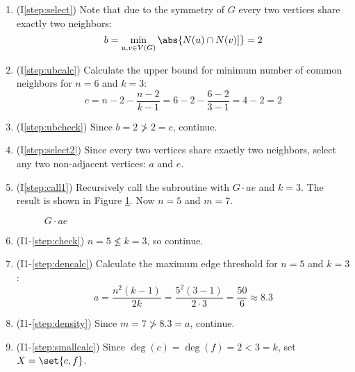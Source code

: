 \begin{enumerate}
\item (I\ref{step:select}) Note that due to the symmetry of \(G\) every two vertices share exactly two neighbors:
  \[b=\min_{u,v\in V(G)}\abs{N(u)\cap N(v)]}=2\]

\item (I\ref{step:ubcalc}) Calculate the upper bound for minimum number of common neighbors for \(n=6\) and
  \(k=3\):
  \[c=n-2-\frac{n-2}{k-1}=6-2-\frac{6-2}{3-1}=4-2=2\]

\item (I\ref{step:ubcheck}) Since \(b=2\ngtr2=c\), continue.

\item (I\ref{step:select2}) Since every two vertices share exactly two neighbors, select any two non-adjacent
  vertices: \(a\) and \(e\).

\item (I\ref{step:call1}) Recursively call the subroutine with \(G\cdot ae\) and \(k=3\).  The result is shown in
  Figure \ref{fig:conae}.  Now \(n=5\) and \(m=7\).

  \begin{figure}[h]
    \label{fig:conae}
    \begin{center}
    \end{center}
    \caption{\(G\cdot ae\)}
  \end{figure}

\item (I1-\ref{step:check}) \(n=5\nleq k=3\), so continue.

\item (I1-\ref{step:dencalc}) Calculate the maximum edge threshold for \(n=5\) and \(k=3\):
  \[a=\frac{n^2(k-1)}{2k}=\frac{5^2(3-1)}{2\cdot3}=\frac{50}{6}\approx8.3\]

\item (I1-\ref{step:density}) Since \(m=7\ngtr8.3=a\), continue.

\item (I1-\ref{step:smallcalc}) Since \(\deg(c)=\deg(f)=2<3=k\), set \(X=\set{c,f}\).


\end{enumerate}

